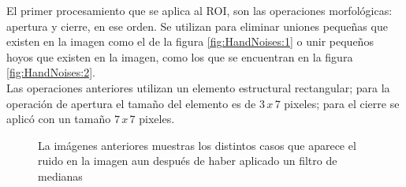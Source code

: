 El primer procesamiento que se aplica al ROI, son las operaciones morfológicas: apertura y cierre, en ese orden. Se utilizan para eliminar uniones pequeñas que existen en la imagen como el de la figura \ref{fig:HandNoises:1} o unir pequeños hoyos que existen en la imagen, como los que se encuentran en la figura \ref{fig:HandNoises:2}.\\
Las operaciones anteriores utilizan un elemento estructural rectangular; para la operación de apertura el tamaño del elemento es de $3 \, x \, 7$ pixeles; para el cierre se aplic\'o con un tamaño  $7 \, x \, 7$ pixeles.\\
\begin{figure}[h!]
\begin{center} 
      \qquad
{}  
\end{center}
\caption{La imágenes anteriores muestras los distintos casos que aparece el ruido en la imagen aun después de haber aplicado un filtro de medianas}
\label{fig:HandNoises}
\end{figure}  

